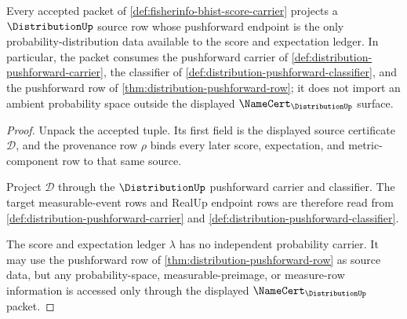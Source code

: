 \begin{theorem}
\label{thm:fisherinfo-distribution-source-obligation}
Every accepted packet of \autoref{def:fisherinfo-bhist-score-carrier}
projects a $\DistributionUp$ source row whose pushforward endpoint is the only
probability-distribution data available to the score and expectation ledger.
In particular, the packet consumes the pushforward carrier of
\autoref{def:distribution-pushforward-carrier}, the classifier of
\autoref{def:distribution-pushforward-classifier}, and the pushforward row of
\autoref{thm:distribution-pushforward-row}; it does not import an ambient
probability space outside the displayed $\NameCert_{\DistributionUp}$ surface.
\end{theorem}
\begin{proof}
Unpack the accepted tuple. Its first field is the displayed source certificate
$\mathcal{D}$, and the provenance row $\rho$ binds every later score,
expectation, and metric-component row to that same source.

Project $\mathcal{D}$ through the $\DistributionUp$ pushforward carrier and
classifier. The target measurable-event rows and RealUp endpoint rows are
therefore read from \autoref{def:distribution-pushforward-carrier} and
\autoref{def:distribution-pushforward-classifier}.

The score and expectation ledger $\lambda$ has no independent probability
carrier. It may use the pushforward row of
\autoref{thm:distribution-pushforward-row} as source data, but any
probability-space, measurable-preimage, or measure-row information is accessed
only through the displayed $\NameCert_{\DistributionUp}$ packet.
\end{proof}

